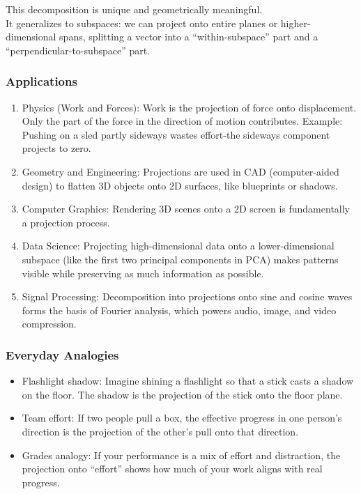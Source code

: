 \documentclass[
  letterpaper,
  DIV=11,
  numbers=noendperiod]{scrreprt}
\providecommand{\tightlist}{%
  \setlength{\itemsep}{0pt}\setlength{\parskip}{0pt}}
\begin{document}
This decomposition is unique and geometrically meaningful.\\
It generalizes to subspaces: we can project onto entire planes or
higher-dimensional spans, splitting a vector into a ``within-subspace''
part and a ``perpendicular-to-subspace'' part.

\subsubsection{Applications}\label{applications}

\begin{enumerate}
\def\labelenumi{\arabic{enumi}.}
\item
  Physics (Work and Forces): Work is the projection of force onto
  displacement. Only the part of the force in the direction of motion
  contributes. Example: Pushing on a sled partly sideways wastes
  effort-the sideways component projects to zero.
\item
  Geometry and Engineering: Projections are used in CAD (computer-aided
  design) to flatten 3D objects onto 2D surfaces, like blueprints or
  shadows.
\item
  Computer Graphics: Rendering 3D scenes onto a 2D screen is
  fundamentally a projection process.
\item
  Data Science: Projecting high-dimensional data onto a
  lower-dimensional subspace (like the first two principal components in
  PCA) makes patterns visible while preserving as much information as
  possible.
\item
  Signal Processing: Decomposition into projections onto sine and cosine
  waves forms the basis of Fourier analysis, which powers audio, image,
  and video compression.
\end{enumerate}

\subsubsection{Everyday Analogies}\label{everyday-analogies-5}

\begin{itemize}
\tightlist
\item
  Flashlight shadow: Imagine shining a flashlight so that a stick casts
  a shadow on the floor. The shadow is the projection of the stick onto
  the floor plane.
\item
  Team effort: If two people pull a box, the effective progress in one
  person's direction is the projection of the other's pull onto that
  direction.
\item
  Grades analogy: If your performance is a mix of effort and
  distraction, the projection onto ``effort'' shows how much of your
  work aligns with real progress.
\end{itemize}
\end{document}
